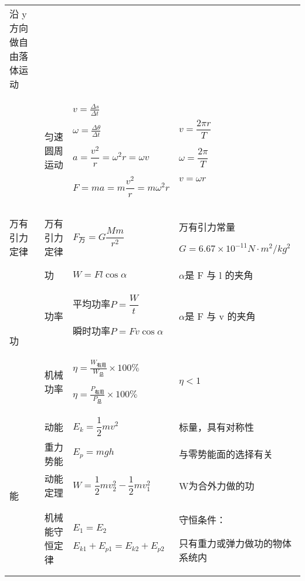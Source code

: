 \documentclass[cn,11pt,answer,founder]{elegantbook}
\begin{document}
\begin{longtable}[]{@{}|m{1.07cm}|m{2.43cm}|m{4cm}|m{5.5cm}|@{}}
	沿 y 方向做自由落体运动\tabularnewline
	\cline{2-4}
	&匀速圆周运动&
	$v=\frac{\Delta s}{\Delta t}$

	$\omega=\frac{\Delta \theta}{\Delta t}$

	$a=\dfrac{v^2}{r}=\omega^2r=\omega v$

	$F=ma=m\dfrac{v^2}{r}=m\omega^2r$
	&
	$v=\dfrac{2\pi r}{T}$

	$\omega=\dfrac{2\pi}{T}$

	$v=\omega r$\tabularnewline
	\cline{1-4}
	万有引力定律&万有引力定律&$F_\text{万}=G\dfrac{Mm}{r^2}$&万有引力常量

	$G= 6.67 \times 10^{−11}N·𝑚^2/kg^2$\tabularnewline
	\cline{1-4}
	\multirow{3}{1cm}{功}
	&功 &$W=Fl\cos\alpha$&$\alpha$是 F 与 l 的夹角\tabularnewline
	\cline{2-4}
	&功率&
	平均功率$P=\dfrac{W}{t}$

	瞬时功率$P=Fv\cos\alpha$
	&$\alpha$是 F 与 v 的夹角\tabularnewline
	\cline{2-4}
	&机械功率&$\eta =\frac{W_\text{有用}}{W_\text{总}}\times 100\% $
	
	$\eta =\frac{P_\text{有用}}{P_\text{总}}\times 100\%$
	&$\eta<1$\tabularnewline
	\cline{1-4}
	\multirow{4}{1cm}{能}
	&
	动能&$E_k=\dfrac{1}{2}mv^2$&标量，具有对称性\tabularnewline
	\cline{2-4}
	&重力势能&$E_p=mgh$&与零势能面的选择有关\tabularnewline
	\cline{2-4}
	&动能定理&$W=\dfrac{1}{2}mv_2^2-\dfrac{1}{2}mv_1^2$&W为合外力做的功\tabularnewline
	\cline{2-4}
	&机械能守恒定律&
	$E_1=E_2$

	$E_{k1}+E_{p1}=E_{k2}+E_{p2}$
	&守恒条件：

	只有重力或弹力做功的物体系统内\tabularnewline
	\cline{1-4}
\end{longtable}
\end{document}
